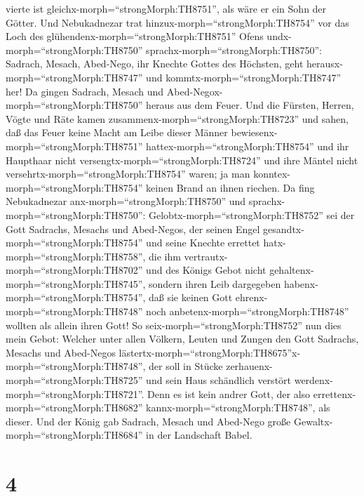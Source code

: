vierte ist gleichx-morph=``strongMorph:TH8751'', als wäre er ein Sohn
der Götter.  Und Nebukadnezar trat
hinzux-morph=``strongMorph:TH8754'' vor das Loch des
glühendenx-morph=``strongMorph:TH8751'' Ofens
undx-morph=``strongMorph:TH8750'' sprachx-morph=``strongMorph:TH8750'':
Sadrach, Mesach, Abed-Nego, ihr Knechte Gottes des Höchsten, geht
herausx-morph=``strongMorph:TH8747'' und
kommtx-morph=``strongMorph:TH8747'' her! Da gingen Sadrach, Mesach und
Abed-Negox-morph=``strongMorph:TH8750'' heraus aus dem Feuer.
 Und die Fürsten, Herren, Vögte und Räte kamen
zusammenx-morph=``strongMorph:TH8723'' und sahen, daß das Feuer keine
Macht am Leibe dieser Männer bewiesenx-morph=``strongMorph:TH8751''
hattex-morph=``strongMorph:TH8754'' und ihr Haupthaar nicht
versengtx-morph=``strongMorph:TH8724'' und ihre Mäntel nicht
versehrtx-morph=``strongMorph:TH8754'' waren; ja man
konntex-morph=``strongMorph:TH8754'' keinen Brand an ihnen riechen.
 Da fing Nebukadnezar anx-morph=``strongMorph:TH8750'' und
sprachx-morph=``strongMorph:TH8750'':
Gelobtx-morph=``strongMorph:TH8752'' sei der Gott Sadrachs, Mesachs und
Abed-Negos, der seinen Engel gesandtx-morph=``strongMorph:TH8754'' und
seine Knechte errettet hatx-morph=``strongMorph:TH8758'', die ihm
vertrautx-morph=``strongMorph:TH8702'' und des Königs Gebot nicht
gehaltenx-morph=``strongMorph:TH8745'', sondern ihren Leib dargegeben
habenx-morph=``strongMorph:TH8754'', daß sie keinen Gott
ehrenx-morph=``strongMorph:TH8748'' noch
anbetenx-morph=``strongMorph:TH8748'' wollten als allein ihren Gott!
 So seix-morph=``strongMorph:TH8752'' nun dies mein Gebot:
Welcher unter allen Völkern, Leuten und Zungen den Gott Sadrachs,
Mesachs und Abed-Negos
lästertx-morph=``strongMorph:TH8675''x-morph=``strongMorph:TH8748'', der
soll in Stücke zerhauenx-morph=``strongMorph:TH8725'' und sein Haus
schändlich verstört werdenx-morph=``strongMorph:TH8721''. Denn es ist
kein andrer Gott, der also errettenx-morph=``strongMorph:TH8682''
kannx-morph=``strongMorph:TH8748'', als dieser.  Und der
König gab Sadrach, Mesach und Abed-Nego große
Gewaltx-morph=``strongMorph:TH8684'' in der Landschaft Babel.

\hypertarget{section-3}{%
\section{4}\label{section-3}}

